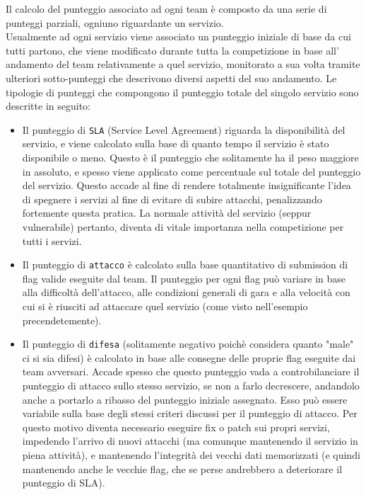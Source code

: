 Il calcolo del punteggio associato ad ogni team è composto da una serie di punteggi parziali, ogniuno riguardante un servizio.\\
Usualmente ad ogni servizio viene associato un punteggio iniziale di base da cui tutti partono, che viene modificato durante tutta la competizione in base all'
andamento del team relativamente a quel servizio, monitorato a sua volta tramite ulteriori sotto-punteggi che descrivono diversi aspetti del suo andamento.
Le tipologie di punteggi che compongono il punteggio totale del singolo servizio sono descritte in seguito:
\begin{itemize}
    \setlength{\itemsep}{5pt}
    \setlength{\parskip}{5pt}
    \item Il punteggio di \texttt{SLA} (Service Level Agreement) riguarda la disponibilità del servizio, e viene calcolato sulla base di quanto tempo il servizio è stato disponibile o meno.
    Questo è il punteggio che solitamente ha il peso maggiore in assoluto, e spesso viene applicato come percentuale sul totale del punteggio del servizio. Questo accade al fine di
    rendere totalmente insignificante l'idea di spegnere i servizi al fine di evitare di subire attacchi, penalizzando fortemente questa pratica.
    La normale attività del servizio (seppur vulnerabile) pertanto, diventa di vitale importanza nella competizione per tutti i servizi.
    \item Il punteggio di \texttt{attacco} è calcolato sulla base quantitativo di submission di flag valide eseguite dal team. Il punteggio per ogni flag può variare in base alla difficoltà dell'attacco,
    alle condizioni generali di gara e alla velocità con cui si è riusciti ad attaccare quel servizio (come visto nell'esempio precendetemente).
    \item Il punteggio di \texttt{difesa} (solitamente negativo poichè considera quanto "male" ci si sia difesi) è calcolato in base alle consegne
    delle proprie flag eseguite dai team avversari. Accade spesso che questo punteggio vada a controbilanciare il punteggio di attacco sullo stesso servizio, se non a farlo decrescere, andandolo anche a
    portarlo a ribasso del punteggio iniziale assegnato. Esso può essere variabile sulla base degli stessi criteri discussi per il punteggio di attacco. Per questo motivo diventa necessario eseguire
    fix o patch sui propri servizi, impedendo l'arrivo di nuovi attacchi (ma comunque mantenendo il servizio in piena attività),
    e mantenendo l'integrità dei vecchi dati memorizzati (e quindi mantenendo anche le vecchie flag, che se perse andrebbero a deteriorare il punteggio di SLA).
\end{itemize}

